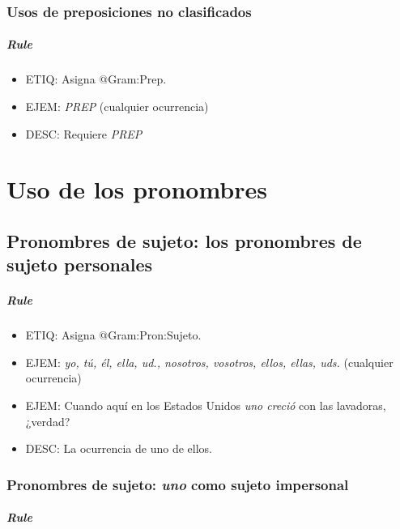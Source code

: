 \documentclass[11pt]{report}
\begin{document}
\subsection{Usos de preposiciones no clasificados}
\paragraph*{Rule}
\begin{itemize}
\item ETIQ: Asigna @Gram:Prep.
\item EJEM: \emph{PREP} (cualquier ocurrencia)
\item DESC: Requiere \emph{PREP}
\end{itemize}

\chapter{Uso de los pronombres}
\section{Pronombres de sujeto: los pronombres de sujeto personales}
\paragraph*{Rule}
\begin{itemize}
\item ETIQ: Asigna @Gram:Pron:Sujeto.
\item EJEM: \emph{yo, tú, él, ella, ud., nosotros, vosotros, ellos, ellas, uds.} (cualquier ocurrencia)
\item EJEM: Cuando aquí en los Estados Unidos \emph{uno creció} con las lavadoras, ¿verdad? 
\item DESC: La ocurrencia de uno de ellos.
\end{itemize}

\subsection{Pronombres de sujeto: \emph{uno} como sujeto impersonal}
\paragraph*{Rule}
\end{document}
